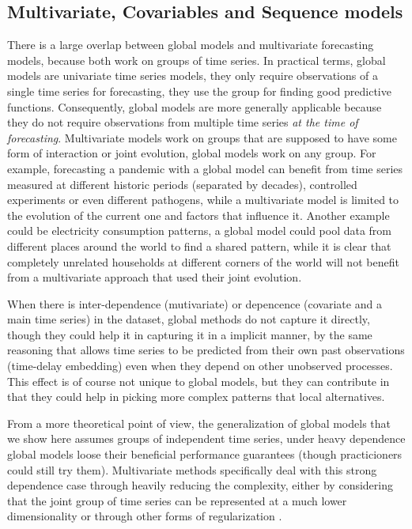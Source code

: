 \documentclass[a4paper]{article}
\theoremstyle{custom}
\begin{document}
\subsection{Multivariate, Covariables and Sequence models}


There is a large overlap between global models and multivariate forecasting models, because both work on groups of time series.
In practical terms, global models are univariate time series models, they only require observations of a single time series for forecasting, they use the group for finding good predictive functions. Consequently, global models are more generally applicable because they do not require observations from multiple time series \textit{at the time of forecasting}.
Multivariate models work on groups that are supposed to have some form of interaction or joint evolution, global models work on any group. For example, forecasting a pandemic with a global model can benefit from time series measured at different historic periods (separated by decades), controlled experiments or even different pathogens, while a multivariate model is limited to the evolution of the current one and factors that influence it. Another example could be electricity consumption patterns, a global model could pool data from different places around the world to find a shared pattern, while it is clear that completely unrelated households at different corners of the world will not benefit from a multivariate approach that used their joint evolution.

When there is inter-dependence (mutivariate) or depencence (covariate and a main time series) in the dataset, global methods do not capture it directly, though they could help it in capturing it in a implicit manner, by the same reasoning that allows time series to be predicted from their own past observations (time-delay embedding) even when they depend on other unobserved processes. This effect is of course not unique to global models, but they can contribute in that they could help in picking more complex patterns that local alternatives.

From a more theoretical point of view, the generalization of global models that we show here assumes groups of independent time series, under heavy dependence global models loose their beneficial performance guarantees (though practicioners could still try them). Multivariate methods specifically deal with this strong dependence case through heavily reducing the complexity, either by considering that the joint group of time series can be represented at a much lower dimensionality or through other forms of regularization \cite{sen2019think, wang2019deep}.
\end{document}
